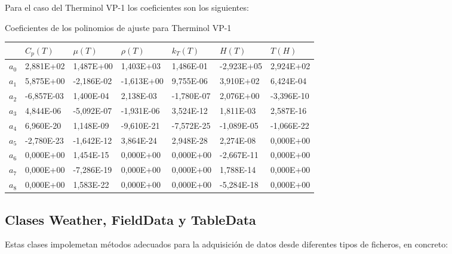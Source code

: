 Para el caso del Therminol VP-1 los coeficientes son los siguientes:

Coeficientes de los polinomios de ajuste para Therminol VP-1

\begin{longtable}[!h]{@{}lllllll@{}}

& \(C_p(T)\) & \(\mu(T)\) & \(\rho(T)\) & \(k_T(T)\) & \(H(T)\) &
\(T(H)\)\tabularnewline

\endhead
\(a_0\) & 2,881E+02 & 1,487E+00 & 1,403E+03 & 1,486E-01 & -2,923E+05 &
2,924E+02\tabularnewline
\(a_1\) & 5,875E+00 & -2,186E-02 & -1,613E+00 & 9,755E-06 & 3,910E+02 &
6,424E-04\tabularnewline
\(a_2\) & -6,857E-03 & 1,400E-04 & 2,138E-03 & -1,780E-07 & 2,076E+00 &
-3,396E-10\tabularnewline
\(a_3\) & 4,844E-06 & -5,092E-07 & -1,931E-06 & 3,524E-12 & 1,811E-03 &
2,587E-16\tabularnewline
\(a_4\) & 6,960E-20 & 1,148E-09 & -9,610E-21 & -7,572E-25 & -1,089E-05 &
-1,066E-22\tabularnewline
\(a_5\) & -2,780E-23 & -1,642E-12 & 3,864E-24 & 2,948E-28 & 2,274E-08 &
0,000E+00\tabularnewline
\(a_6\) & 0,000E+00 & 1,454E-15 & 0,000E+00 & 0,000E+00 & -2,667E-11 &
0,000E+00\tabularnewline
\(a_7\) & 0,000E+00 & -7,286E-19 & 0,000E+00 & 0,000E+00 & 1,788E-14 &
0,000E+00\tabularnewline
\(a_8\) & 0,000E+00 & 1,583E-22 & 0,000E+00 & 0,000E+00 & -5,284E-18 &
0,000E+00\tabularnewline

\end{longtable}


\subsection{Clases Weather, FieldData y TableData}
\label{clases-weather}
Estas clases impolemetan métodos adecuados para la adquisición de datos desde diferentes tipos de ficheros, en concreto:

